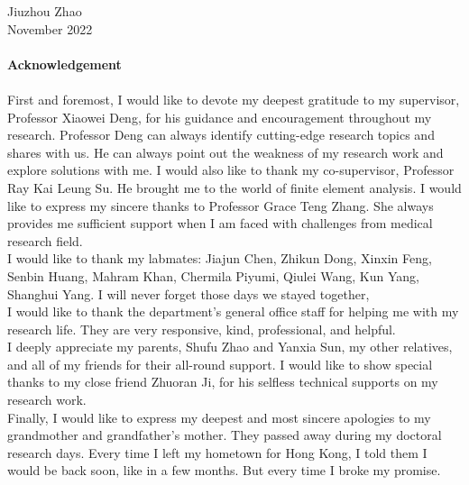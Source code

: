 \documentclass[12pt]{extbook}
\begin{document}
\flushright

Jiuzhou Zhao\\
November 2022\\

\justifying
\newpage
\thispagestyle{empty}
~\\

\newpage
\thispagestyle{empty}
\centering
{\bf \large Acknowledgement}\\
~\\
\justifying
First and foremost, I would like to devote my deepest gratitude to my supervisor, Professor Xiaowei Deng, for his guidance and encouragement throughout my research. Professor Deng can always identify cutting-edge research topics and shares with us. He can always point out the weakness of my research work and explore solutions with me. I would also like to thank my co-supervisor, Professor Ray Kai Leung Su. He brought me to the world of finite element analysis. I would like to express my sincere thanks to Professor Grace Teng Zhang. She always provides me sufficient support when I am faced with challenges from medical research field.\\

I would like to thank my labmates: Jiajun Chen, Zhikun Dong, Xinxin Feng, Senbin Huang, Mahram Khan, Chermila Piyumi, Qiulei Wang, Kun Yang, Shanghui Yang. I will never forget those days we stayed together,\\

I would like to thank the department's general office staff for helping me with my research life. They are very responsive, kind, professional, and helpful.\\

I deeply appreciate my parents, Shufu Zhao and Yanxia Sun, my other relatives, and all of my friends for their all-round support. I would like to show special thanks to my close friend Zhuoran Ji, for his selfless technical supports on my research work.\\

Finally, I would like to express my deepest and most sincere apologies to my grandmother and grandfather's mother. They passed away during my doctoral research days. Every time I left my hometown for Hong Kong, I told them I would be back soon, like in a few months. But every time I broke my promise.\\
\thispagestyle{empty}
\newpage
\setcounter{page}{1}
\end{document}
